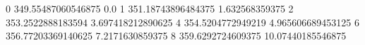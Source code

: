 0 349.55487060546875 0.0
1 351.18743896484375 1.632568359375
2 353.2522888183594 3.697418212890625
4 354.5204772949219 4.965606689453125
6 356.77203369140625 7.2171630859375
8 359.6292724609375 10.07440185546875
